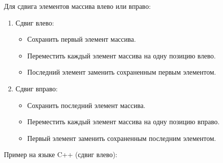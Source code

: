 \documentclass[
]{article}
\providecommand{\tightlist}{%
  \setlength{\itemsep}{0pt}\setlength{\parskip}{0pt}}
\begin{document}
Для сдвига элементов массива влево или вправо:

\begin{enumerate}
\def\labelenumi{\arabic{enumi}.}
\tightlist
\item
  Сдвиг влево:

  \begin{itemize}
  \tightlist
  \item
    Сохранить первый элемент массива.
  \item
    Переместить каждый элемент массива на одну позицию влево.
  \item
    Последний элемент заменить сохраненным первым элементом.
  \end{itemize}
\item
  Сдвиг вправо:

  \begin{itemize}
  \tightlist
  \item
    Сохранить последний элемент массива.
  \item
    Переместить каждый элемент массива на одну позицию вправо.
  \item
    Первый элемент заменить сохраненным последним элементом.
  \end{itemize}
\end{enumerate}

Пример на языке C++ (сдвиг влево):
\end{document}
